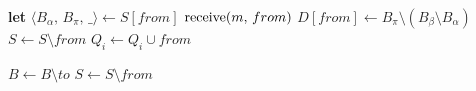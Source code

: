 {   {
    \textbf{let} $\langle B_\alpha,\, B_\pi,\, \_ \rangle \leftarrow S[from]$ \;
    {$\textup{receive}(m,\,from)$ \label{line:todeliver}}
    $D[from] \leftarrow B_\pi \setminus (B_\beta\setminus B_\alpha)$ \label{line:toexpect} 
    $S \leftarrow S \setminus from$ \;
    $Q_i \leftarrow Q_i \cup from$ 
  }
  
  \BlankLine

   {
    $B \leftarrow B \setminus to$
  }
   {
    $S \leftarrow S \setminus from$
  }

}


